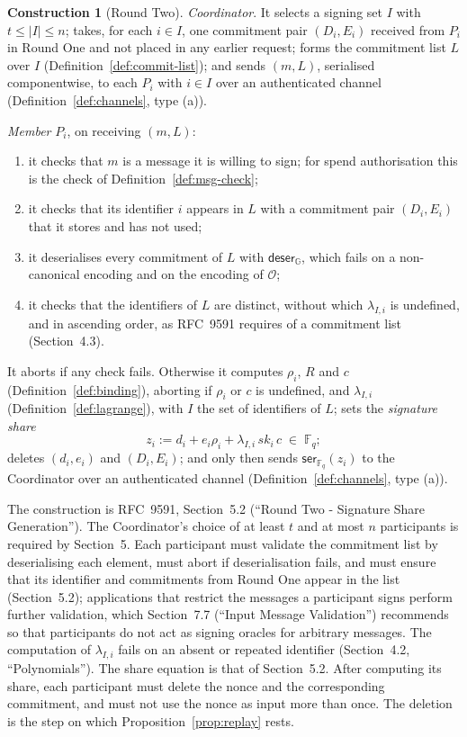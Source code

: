 \documentclass[11pt,a4paper]{article}
\theoremstyle{definition}
\newtheorem{construction}[theorem]{Construction}
\newcommand{\F}{\mathbb{F}}
\newcommand{\G}{\mathbb{G}}
\newcommand{\Fq}{\F_q}
\begin{document}
\begin{construction}[Round Two]\label{def:round2}
\emph{Coordinator}. It selects a signing set \(I\) with
\(t \le \lvert I \rvert \le n\); takes, for each \(i \in I\), one
commitment pair \((D_i, E_i)\) received from \(P_i\) in Round One and not
placed in any earlier request; forms the commitment list \(L\) over \(I\)
(Definition~\ref{def:commit-list}); and sends \((m, L)\), serialised
componentwise, to each \(P_i\) with \(i \in I\) over an authenticated
channel (Definition~\ref{def:channels}, type (a)).

\emph{Member} \(P_i\), on receiving \((m, L)\):
\begin{enumerate}
\item it checks that \(m\) is a message it is willing to sign; for spend
  authorisation this is the check of Definition~\ref{def:msg-check};
\item it checks that its identifier \(i\) appears in \(L\) with a
  commitment pair \((D_i, E_i)\) that it stores and has not used;
\item it deserialises every commitment of \(L\) with
  \(\mathsf{deser}_{\G}\), which fails on a non-canonical encoding and on
  the encoding of \(\mathcal{O}\);
\item it checks that the identifiers of \(L\) are distinct, without which
  \(\lambda_{I,i}\) is undefined, and in ascending order, as RFC~9591
  requires of a commitment list (Section~4.3).
\end{enumerate}
It aborts if any check fails. Otherwise it computes \(\rho_i\),
\(R\) and \(c\) (Definition~\ref{def:binding}), aborting if \(\rho_i\) or
\(c\) is undefined, and \(\lambda_{I,i}\) (Definition~\ref{def:lagrange}), with
\(I\) the set of identifiers of \(L\); sets the \emph{signature share}
\[
  z_i := d_i + e_i \rho_i + \lambda_{I,i}\, \mathit{sk}_i\, c
  \;\in\; \Fq ;
\]
deletes \((d_i, e_i)\) and \((D_i, E_i)\); and only then sends
\(\mathsf{ser}_{\Fq}(z_i)\) to the Coordinator over an authenticated
channel (Definition~\ref{def:channels}, type (a)).
\end{construction}

The construction is RFC~9591, Section~5.2 (``Round Two - Signature Share
Generation''). The Coordinator's choice of at least \(t\) and at most \(n\)
participants is required by Section~5. Each participant must validate the
commitment list by deserialising each element, must abort if
deserialisation fails, and must ensure that its identifier and commitments
from Round One appear in the list (Section~5.2); applications that restrict
the messages a participant signs perform further validation, which
Section~7.7 (``Input Message Validation'') recommends so that participants
do not act as signing oracles for arbitrary messages. The computation of
\(\lambda_{I,i}\) fails on an absent or repeated identifier (Section~4.2,
``Polynomials''). The share equation is that of Section~5.2. After
computing its share, each participant must delete the nonce and the
corresponding commitment, and must not use the nonce as input more than
once. The deletion is the step on which Proposition~\ref{prop:replay}
rests.
\end{document}

